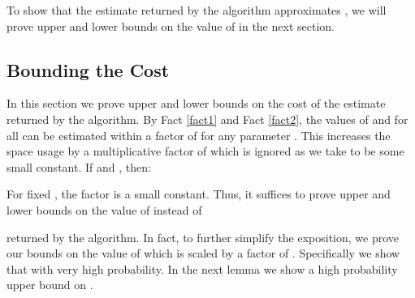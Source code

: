 \documentclass[oribibl]{llncs}
\begin{document}
To show that the estimate  returned by the algorithm approximates ,
we will prove upper and lower bounds on the value of  in the next
section. 

\subsection{Bounding the Cost}\label{cost}
In this section we prove upper and lower bounds on the cost of the estimate
returned by the algorithm.
By Fact \ref{fact1} and Fact \ref{fact2}, the values of  and
 for all  can be estimated within a factor
of  for any parameter .
This increases the space usage by a multiplicative factor of 
which is ignored as we take  to be some small constant.
If  and ,
then:


For fixed , the factor  is a small constant.
Thus, it suffices to prove upper and lower bounds on the value of
 instead of

returned by the algorithm.
In fact, to further simplify the exposition, we prove our bounds on the value of 
 which is scaled
by a factor of . Specifically we show that 
 with very high probability.
In the next lemma we show a high probability upper bound on .
\end{document}
